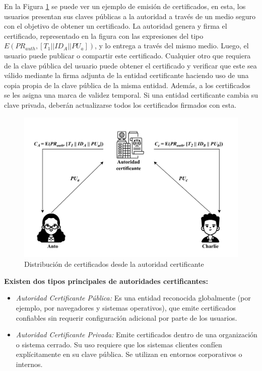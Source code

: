 En la Figura \ref{fig:CADist} se puede ver un ejemplo de emisión de certificados, en esta, los usuarios presentan sus claves públicas a la autoridad a través de un medio seguro con el objetivo de obtener un certificado. La autoridad genera y firma el certificado, representado en la figura con las expresiones del tipo $E(PR_{auth},[T_1||ID_A||PU_a])$, y lo entrega a través del mismo medio. Luego, el usuario puede publicar o compartir este certificado. Cualquier otro que requiera de la clave pública del usuario puede obtener el certificado y verificar que este sea válido mediante la firma adjunta de la entidad certificante haciendo uso de una copia propia de la clave pública de la misma entidad. Además, a los certificados se les asigna una marca de validez temporal. Si una entidad certificante cambia su clave privada, deberán actualizarse todos los certificados firmados con esta.

\begin{figure}
    \centering
    \includegraphics[width=\textwidth]{Imagenes/Seguridad de las comunicaciones/EntidadCertificante.pdf}
    \caption{Distribución de certificados desde la autoridad certificante}
    \label{fig:CADist}
\end{figure}

\textbf{Existen dos tipos principales de autoridades certificantes:}

\begin{itemize}
    \item \textit{Autoridad Certificante Pública:} Es una entidad reconocida globalmente (por ejemplo, por navegadores y sistemas operativos), que emite certificados confiables sin requerir configuración adicional por parte de los usuarios.
    \item \textit{Autoridad Certificante Privada:} Emite certificados dentro de una organización o sistema cerrado. Su uso requiere que los sistemas clientes confíen explícitamente en su clave pública. Se utilizan en entornos corporativos o internos.
\end{itemize}


